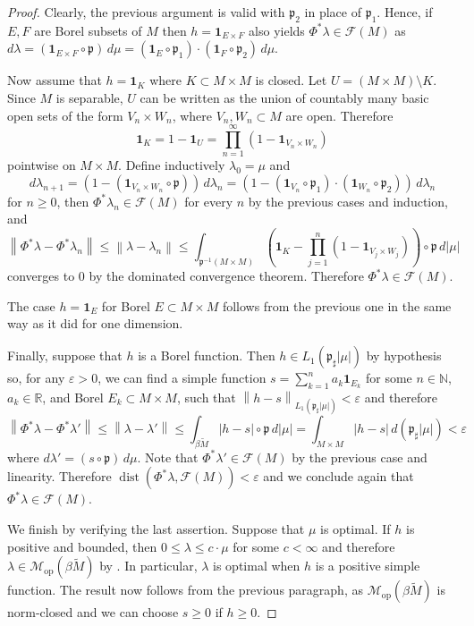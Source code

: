 \documentclass[a4paper,10pt]{amsart}
\DeclareMathOperator{\dist}{dist}                           %
\newcommand{\NN}{\mathbb{N}}                                %
\newcommand{\RR}{\mathbb{R}}                                %
\newcommand{\abs}[1]{\left|{#1}\right|}                     %
\newcommand{\norm}[1]{\left\|{#1}\right\|}                  %
\newcommand{\lipfree}[1]{\mathcal{F}({#1})}                 %
\newcommand{\wt}[1]{\widetilde{#1}}                         %
\newcommand{\bwt}[1]{\beta\wt{#1}}                          %
\newcommand{\pp}{\mathfrak{p}}                              %
\newcommand{\opr}[1]{\mathcal{M}_{\mathrm{op}}(#1)}         %
\renewcommand{\leq}{\leqslant}
\renewcommand{\geq}{\geqslant}
\theoremstyle{plain}
\theoremstyle{definition}
\theoremstyle{remark}
\begin{document}
\begin{proof}
Clearly, the previous argument is valid with $\pp_2$ in place of $\pp_1$. Hence, if $E,F$ are Borel subsets of $M$ then $h=\mathbf{1}_{E\times F}$ also yields $\Phi^*\lambda\in\lipfree{M}$ as $d\lambda = (\mathbf{1}_{E\times F}\circ\pp)\,d\mu = (\mathbf{1}_E\circ\pp_1)\cdot(\mathbf{1}_F\circ\pp_2)\,d\mu$.

Now assume that $h=\mathbf{1}_K$ where $K\subset M\times M$ is closed. Let $U=(M\times M)\setminus K$. Since $M$ is separable, $U$ can be written as the union of countably many basic open sets of the form $V_n\times W_n$, where $V_n,W_n\subset M$ are open. Therefore
$$
\mathbf{1}_K = 1 - \mathbf{1}_U = \prod_{n=1}^\infty (1 - \mathbf{1}_{V_n\times W_n})
$$
pointwise on $M\times M$. Define inductively $\lambda_0=\mu$ and
$$
d\lambda_{n+1} = (1-(\mathbf{1}_{V_n\times W_n}\circ\pp))\,d\lambda_n = (1-(\mathbf{1}_{V_n}\circ\pp_1)\cdot(\mathbf{1}_{W_n}\circ\pp_2))\,d\lambda_n
$$
for $n\geq 0$, then $\Phi^*\lambda_n\in\lipfree{M}$ for every $n$ by the previous cases and induction, and
$$
\norm{\Phi^*\lambda-\Phi^*\lambda_n} \leq \norm{\lambda-\lambda_n} \leq \int_{\pp^{-1}(M\times M)}\left(\mathbf{1}_K - \prod_{j=1}^n (1 - \mathbf{1}_{V_j\times W_j})\right)\circ\pp \,d|\mu|
$$
converges to $0$ by the dominated convergence theorem. Therefore $\Phi^*\lambda\in\lipfree{M}$.

The case $h=\mathbf{1}_E$ for Borel $E\subset M\times M$ follows from the previous one in the same way as it did for one dimension.

Finally, suppose that $h$ is a Borel function. Then $h\in L_1(\pp_\sharp\abs{\mu})$ by hypothesis so, for any $\varepsilon>0$, we can find a simple function $s=\sum_{k=1}^n a_k\mathbf{1}_{E_k}$ for some $n\in\NN$, $a_k\in\RR$, and Borel $E_k\subset M\times M$, such that $\norm{h-s}_{L_1(\pp_\sharp\abs{\mu})} < \varepsilon$ and therefore
$$
\norm{\Phi^*\lambda - \Phi^*\lambda'} \leq \norm{\lambda-\lambda'} \leq \int_{\bwt{M}} \abs{h-s}\circ\pp\,d\abs{\mu} = \int_{M\times M} \abs{h-s}\,d(\pp_\sharp\abs{\mu}) < \varepsilon
$$
where $d\lambda'=(s\circ\pp)\,d\mu$. Note that $\Phi^*\lambda'\in\lipfree{M}$ by the previous case and linearity. Therefore $\dist(\Phi^*\lambda,\lipfree{M})<\varepsilon$ and we conclude again that $\Phi^*\lambda\in\lipfree{M}$.

We finish by verifying the last assertion. Suppose that $\mu$ is optimal. If $h$ is positive and bounded, then $0\leq\lambda\leq c\cdot\mu$ for some $c<\infty$ and therefore $\lambda\in\opr{\bwt{M}}$ by \cite[Proposition 2.1]{APS1}. In particular, $\lambda$ is optimal when $h$ is a positive simple function. The result now follows from the previous paragraph, as $\opr{\bwt{M}}$ is norm-closed and we can choose $s\geq 0$ if $h\geq 0$.
\end{proof}
\end{document}
